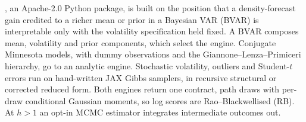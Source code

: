 , an Apache-2.0 Python package, is built on the position that a density-forecast gain credited to a richer mean or prior in a Bayesian VAR (BVAR) is interpretable only with the volatility specification held fixed. %
A BVAR composes mean, volatility and prior components, which select the engine. %
Conjugate Minnesota models, with dummy observations and the Giannone--Lenza--Primiceri hierarchy, go to an analytic engine. %
Stochastic volatility, outliers and Student-$t$ errors run on hand-written JAX Gibbs samplers, in recursive structural or corrected reduced form. %
Both engines return one contract, path draws with per-draw conditional Gaussian moments, so log scores are Rao--Blackwellised (RB). %
At $h > 1$ an opt-in MCMC estimator integrates intermediate outcomes out. %
